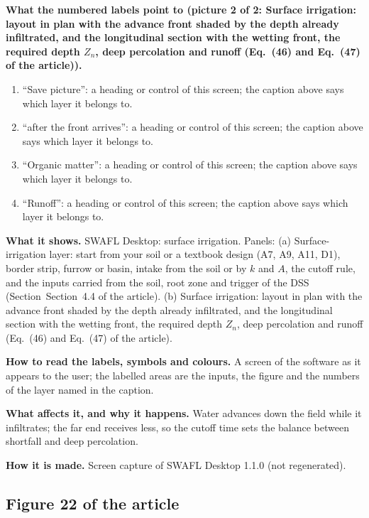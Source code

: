 \textbf{What the numbered labels point to (picture 2 of 2: Surface irrigation: layout in plan with the advance front shaded by the depth already infiltrated, and the longitudinal section with the wetting front, the required depth $Z_n$, deep percolation and runoff (Eq.~(46) and Eq.~(47) of the article)).}
\begin{enumerate}[nosep,label=\protect\circled{\arabic*}]
\item ``Save picture'': a heading or control of this screen; the caption above says which layer it belongs to.
\item ``after the front arrives'': a heading or control of this screen; the caption above says which layer it belongs to.
\item ``Organic matter'': a heading or control of this screen; the caption above says which layer it belongs to.
\item ``Runoff'': a heading or control of this screen; the caption above says which layer it belongs to.
\end{enumerate}

\textbf{What it shows.} SWAFL Desktop: surface irrigation. Panels: (a) Surface-irrigation layer: start from your soil or a textbook design (A7, A9, A11, D1), border strip, furrow or basin, intake from the soil or by $k$ and $A$, the cutoff rule, and the inputs carried from the soil, root zone and trigger of the DSS (Section~Section~4.4 of the article). (b) Surface irrigation: layout in plan with the advance front shaded by the depth already infiltrated, and the longitudinal section with the wetting front, the required depth $Z_n$, deep percolation and runoff (Eq.~(46) and Eq.~(47) of the article).

\textbf{How to read the labels, symbols and colours.} A screen of the software as it appears to the user; the labelled areas are the inputs, the figure and the numbers of the layer named in the caption.

\textbf{What affects it, and why it happens.} Water advances down the field while it infiltrates; the far end receives less, so the cutoff time sets the balance between shortfall and deep percolation. 

\textbf{How it is made.} Screen capture of SWAFL Desktop 1.1.0 (not regenerated).

\subsection*{Figure 22 of the article}

